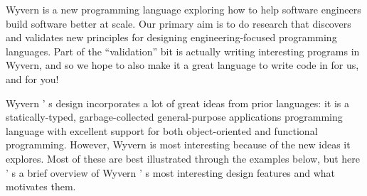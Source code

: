 \documentclass{article}
\begin{document}
\newcommand{\trec}[2]{\mathbf{rec}~#1 . #2}
\newcommand{\trans}[1]{\ll #1 \gg}
\newcommand{\keyw}[1]{\textbf{#1}}\begin{mdP}[data-line={19}]%
{}Wyvern is a new programming language exploring how to help software
engineers build software better at scale.  Our primary aim is to do
research that discovers and validates new principles for designing
engineering-focused programming languages.  Part of the %
{}{\textquotedblleft}validation{\textquotedblright}%
{}
bit is actually writing interesting programs in Wyvern, and so we
hope to also make it a great language to write code in%
{}{\textemdash}%
{}for us,
and for you!%
\end{mdP}%
\begin{mdP}[class={indent,para-continue},data-line={27}]%
{}Wyvern%
{}{'}%
{}s design incorporates a lot of great ideas from prior
languages: it is a statically-typed, garbage-collected general-purpose
applications programming language with excellent support for both
object-oriented and functional programming.  However, Wyvern is most
interesting because of the new ideas it explores.  Most of these are
best illustrated through the examples below, but here%
{}{'}%
{}s a brief
overview of Wyvern%
{}{'}%
{}s most interesting design features and what motivates
them.%
\end{mdP}%
\end{document}
